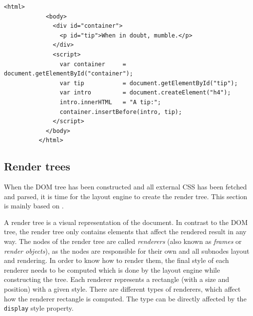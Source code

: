 \documentclass[a4paper,11pt]{kth-mag}
\newcommand{\code}[1]{\texttt{#1}}
\begin{document}
        \begin{lstlisting}[gobble=10,caption={Simple example of reentrant HTML. The \gls{layout engine} needs to reconstruct the \gls{DOM} tree after executing the \gls{JavaScript}. The page will not be rendered until all \gls{JavaScript} has been executed.}, captionpos=b, label={code:reentrant-html}]
          <html>
            <body>
              <div id="container">
                <p id="tip">When in doubt, mumble.</p>
              </div>
              <script>
                var container     = document.getElementById("container");
                var tip           = document.getElementById("tip");
                var intro         = document.createElement("h4");
                intro.innerHTML   = "A tip:";
                container.insertBefore(intro, tip);
              </script>
            </body>
          </html>
        \end{lstlisting}


      \subsection{Render trees}\label{sec:render-tree}
        When the \gls{DOM} tree has been constructed and all external \gls{CSS} has been fetched and parsed, it is time for the \gls{layout engine} to create the \gls{render tree}.
        This section is mainly based on .

        A \gls{render tree} is a visual representation of the \gls{document}.
        In contrast to the \gls{DOM} tree, the \gls{render tree} only contains \glspl{element} that affect the rendered result in any way.
        The nodes of the \gls{render tree} are called \emph{renderers} (also known as \emph{frames} or \emph{render objects}), as the nodes are responsible for their own and all subnodes layout and rendering.
        In order to know how to render them, the final style of each renderer needs to be computed which is done by the \gls{layout engine} while constructing the tree.
        Each renderer represents a rectangle (with a size and position) with a given style.
        There are different types of renderers, which affect how the renderer rectangle is computed.
        The type can be directly affected by the \code{display} style property.
\end{document}
